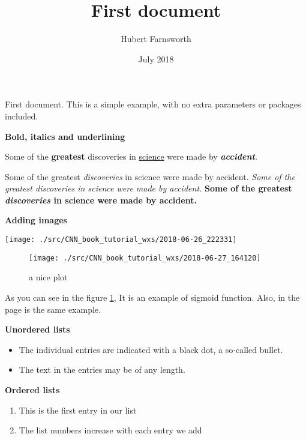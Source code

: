 \documentclass[12pt, letterpaper]{article}
\title{First document}
\author{Hubert Farnsworth}
\date{July 2018}
\begin{document}
\maketitle

\tableofcontents
First document. This is a simple example, with no 
extra parameters or packages included.

\textbf{Bold, italics and underlining}

Some of the \textbf{greatest} discoveries in \underline{science} were made by \textbf{\textit{accident}}.

Some of the greatest \emph{discoveries} in science were made by accident.
\textit{Some of the greatest \emph{discoveries} in science were made by accident.}
\textbf{Some of the greatest \emph{discoveries} in science were made by accident.}

\textbf{Adding images}

\centering
\texttt{[image: ./src/CNN\_book\_tutorial\_wxs/2018-06-26\_222331]}	%

\begin{figure}[ht]
	\centering
	\texttt{[image: ./src/CNN\_book\_tutorial\_wxs/2018-06-27\_164120]}
	\caption{a nice plot}	%
	\label{fig:plot}	%
\end{figure}

As you can see in the figure \ref{fig:plot}, It is an example of sigmoid function. Also, in the page \pageref{fig:plot} is the same example.

\textbf{Unordered lists}

\begin{itemize}
	\item The individual entries are indicated with a black dot, a so-called bullet.
	\item The text in the entries may be of any length.
\end{itemize}

\textbf{Ordered lists}

\begin{enumerate}
	\item This is the first entry in our list
	\item The list numbers increase with each entry we add
\end{enumerate}
\end{document}
